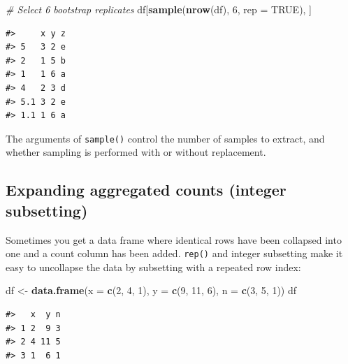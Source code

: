 \documentclass[]{book}
\newenvironment{Shaded}{\begin{snugshade}}{\end{snugshade}}
\newcommand{\KeywordTok}[1]{\textcolor[rgb]{0.13,0.29,0.53}{\textbf{#1}}}
\newcommand{\DataTypeTok}[1]{\textcolor[rgb]{0.13,0.29,0.53}{#1}}
\newcommand{\DecValTok}[1]{\textcolor[rgb]{0.00,0.00,0.81}{#1}}
\newcommand{\StringTok}[1]{\textcolor[rgb]{0.31,0.60,0.02}{#1}}
\newcommand{\CommentTok}[1]{\textcolor[rgb]{0.56,0.35,0.01}{\textit{#1}}}
\newcommand{\OtherTok}[1]{\textcolor[rgb]{0.56,0.35,0.01}{#1}}
\newcommand{\OperatorTok}[1]{\textcolor[rgb]{0.81,0.36,0.00}{\textbf{#1}}}
\newcommand{\NormalTok}[1]{#1}
\theoremstyle{definition}
\theoremstyle{definition}
\theoremstyle{definition}
\theoremstyle{remark}
\begin{document}
\begin{Shaded}
\begin{Highlighting}[]
\CommentTok{# Select 6 bootstrap replicates}
\NormalTok{df[}\KeywordTok{sample}\NormalTok{(}\KeywordTok{nrow}\NormalTok{(df), }\DecValTok{6}\NormalTok{, }\DataTypeTok{rep =} \OtherTok{TRUE}\NormalTok{), ]}
\end{Highlighting}
\end{Shaded}

\begin{verbatim}
#>     x y z
#> 5   3 2 e
#> 2   1 5 b
#> 1   1 6 a
#> 4   2 3 d
#> 5.1 3 2 e
#> 1.1 1 6 a
\end{verbatim}

The arguments of \texttt{sample()} control the number of samples to
extract, and whether sampling is performed with or without replacement.

\subsection{Expanding aggregated counts (integer
subsetting)}\label{expanding-aggregated-counts-integer-subsetting}

Sometimes you get a data frame where identical rows have been collapsed
into one and a count column has been added. \texttt{rep()} and integer
subsetting make it easy to uncollapse the data by subsetting with a
repeated row index:

\begin{Shaded}
\begin{Highlighting}[]
\NormalTok{df <-}\StringTok{ }\KeywordTok{data.frame}\NormalTok{(}\DataTypeTok{x =} \KeywordTok{c}\NormalTok{(}\DecValTok{2}\NormalTok{, }\DecValTok{4}\NormalTok{, }\DecValTok{1}\NormalTok{), }\DataTypeTok{y =} \KeywordTok{c}\NormalTok{(}\DecValTok{9}\NormalTok{, }\DecValTok{11}\NormalTok{, }\DecValTok{6}\NormalTok{), }\DataTypeTok{n =} \KeywordTok{c}\NormalTok{(}\DecValTok{3}\NormalTok{, }\DecValTok{5}\NormalTok{, }\DecValTok{1}\NormalTok{))}
\NormalTok{df}
\end{Highlighting}
\end{Shaded}

\begin{verbatim}
#>   x  y n
#> 1 2  9 3
#> 2 4 11 5
#> 3 1  6 1
\end{verbatim}

\begin{Shaded}
\end{Shaded}
\end{document}
